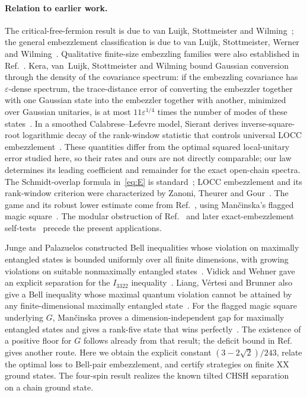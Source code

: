 \documentclass[10pt,a4paper]{article}
\theoremstyle{remark}
\begin{document}
\paragraph{Relation to earlier work.}
The critical-free-fermion result is due to van Luijk, Stottmeister and
Wilming~\cite{vLSW25}; the general embezzlement classification is due to
van Luijk, Stottmeister, Werner and Wilming~\cite{vLSWW24}.
Qualitative finite-size embezzling families were also established in
Ref.~\cite[Section~6.3]{vLSW25}. Kera, van~Luijk, Stottmeister and
Wilming bound Gaussian conversion through the density of the covariance
spectrum: if the embezzling covariance has $\varepsilon$-dense spectrum,
the trace-distance error of converting the embezzler together with one
Gaussian state into the embezzler together with another, minimized over
Gaussian unitaries, is at most $11\varepsilon^{1/4}$ times the number of
modes of these states~\cite[Theorem~1]{KvLSW25}. In a smoothed Calabrese--Lefevre model,
Sierant derives inverse-square-root logarithmic decay of the rank-window
statistic that controls universal LOCC embezzlement~\cite{Sierant26}. These quantities
differ from the optimal squared local-unitary error studied here, so
their rates and ours are not directly comparable; our
law determines its leading coefficient and remainder for the exact
open-chain spectra. The Schmidt-overlap formula in~\eqref{eq:E}
is standard~\cite{vDH03,LeungWang14}; LOCC embezzlement and its rank-window
criterion were characterized by Zanoni, Theurer and Gour~\cite{ZTG24}.
The game and its robust lower estimate come from Ref.~\cite{TG}, using
Man\v{c}inska's flagged magic square~\cite{Mancinska26}. The modular
obstruction of Ref.~\cite{vLSWW24} and later exact-embezzlement
self-tests~\cite{Harris26,PaddockSchmidt26} precede the present applications.

Junge and Palazuelos constructed Bell inequalities whose violation on
maximally entangled states is bounded uniformly over all finite dimensions,
with growing violations on suitable nonmaximally entangled
states~\cite[Theorem~1.4]{JungePalazuelos11}. Vidick and Wehner gave an
explicit separation for the $I_{3322}$ inequality~\cite{VidickWehner11}.
Liang, V\'ertesi and Brunner also give a Bell inequality whose maximal
quantum violation cannot be attained by any finite-dimensional maximally
entangled state~\cite{LiangVertesiBrunner11}.
For the flagged magic square underlying $G$, Man\v{c}inska proves a
dimension-independent gap for maximally entangled states and gives a
rank-five state that wins perfectly~\cite[Corollary~4 and Proposition~1]{Mancinska26}.
The existence of a positive floor for $G$ follows already from that result;
the deficit bound in Ref.~\cite[Section~6.6]{TG} gives another route.
Here we obtain the explicit constant $(3-2\sqrt2)/243$, relate the
optimal loss to Bell-pair embezzlement, and certify strategies on finite
XX ground states. The four-spin result realizes the known tilted CHSH
separation~\cite{AMP12,BP15} on a chain ground state.
\end{document}
